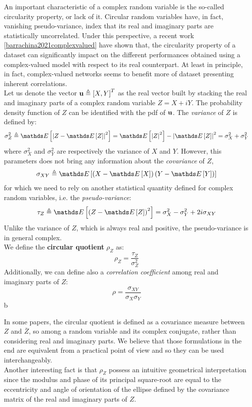 \documentclass[../main.tex]{subfiles}
\begin{document}
An important characteristic of a complex random
variable is the so-called circularity property, or lack of it. Circular random variables have, in fact, vanishing pseudo-variance, index that its real and imaginary parts are statistically uncorrelated. Under this perspective, a recent work \ref{barrachina2021complexvalued} have shown that, the circularity property of a dataset can significantly impact on the different performances obtained using a complex-valued model with respect to its real counterpart. At least in principle, in fact, complex-valued networks seems to benefit more of dataset presenting inherent correlations.\\
Let us denote the vector $\vb{u}\triangleq \left[X,Y\right]^T$ as the real vector built by stacking the real and imaginary parts of a complex random variable $Z = X+iY$. The probability density function of $Z$ can be identified with the pdf of $\vb{u}$. The \textit{variance} of $Z$ is defined by:
\[ \sigma^2_Z \triangleq \Ev{\abs{Z-\Ev{Z}}^2} = \Ev{\abs{Z}^2} - \abs{\Ev{Z}}^2 = \sigma^2_X + \sigma^2_Y \]
where $\sigma^2_X$ and $\sigma^2_Y$ are respectively the variance of $X$ and $Y$. However, this parameters does not bring any information about the \textit{covariance} of $Z$,
\[ \sigma_{XY} \triangleq \Ev{\left(X-\Ev{X}\right)\left(Y-\Ev{Y}\right)} \]
for which we need to rely on another statistical quantity defined for complex random variables, i.e. the \textit{pseudo-variance}:
\[ \tau_Z\triangleq \Ev{\left(Z-\Ev{Z}\right)^2} = \sigma^2_{X} - \sigma^2_Y + 2i\sigma_{XY} \]
Unlike the variance of $Z$, which is always real and positive, the pseudo-variance is in general complex.\\
We define the \textbf{circular quotient} $\rho_Z$ as:
\[ \rho_Z = \frac{\tau_Z}{\sigma^2_Z} \]
Additionally, we can define also a \textit{correlation coefficient} among real and imaginary parts of $Z$:
\[ \rho = \frac{\sigma_{XY}}{\sigma_X\sigma_Y} \]b

In some papers, the circular quotient is defined as a covariance measure between $Z$ and $\bar{Z}$, so among a random variable and its complex conjugate, rather than considering real and imaginary parts. We believe that those formulations in the end are equivalent from a practical point of view and so they can be used interchangeably.\\
Another interesting fact is that $\rho_Z$ possess an intuitive geometrical interpretation since the modulus and phase of its principal square-root are equal to the eccentricity and angle of orientation of the ellipse defined by the covariance matrix of the real and imaginary parts of $Z$.
\end{document}
